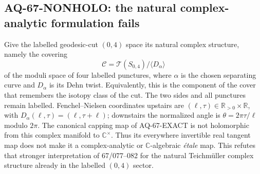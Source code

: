 \subsection{AQ-67-NONHOLO: the natural complex-analytic formulation fails}
Give the labelled geodesic-cut $(0,4)$ space its natural complex
structure, namely the covering
\[
 \mathcal C=\mathcal T(S_{0,4})/\langle D_\alpha\rangle
\]
of the moduli space of four labelled punctures, where $\alpha$ is
the chosen separating curve and $D_\alpha$ is its Dehn twist.
Equivalently, this is the component of the cover that remembers
the isotopy class of the cut. The two sides and all punctures
remain labelled. Fenchel--Nielsen coordinates upstairs are
$(\ell,\tau)\in\mathbb R_{>0}\times\mathbb R$, with
$D_\alpha(\ell,\tau)=(\ell,\tau+\ell)$; downstairs the
normalized angle is $\theta=2\pi\tau/\ell$ modulo $2\pi$.
The canonical capping map of AQ-67-EXACT is not holomorphic
from this complex manifold to $\mathbb C^\times$.
Thus its everywhere invertible real tangent map does not make
it a complex-analytic or $\mathbb C$-algebraic \emph{\'etale}
map. This refutes that stronger interpretation of 67/077--082
for the natural Teichm\"uller complex structure already in
the labelled $(0,4)$ sector.

